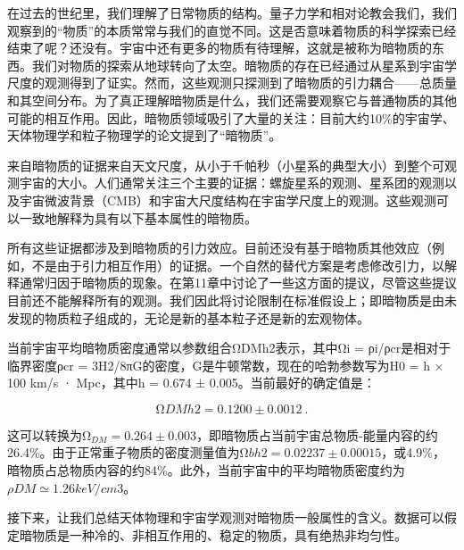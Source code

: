 
在过去的世纪里，我们理解了日常物质的结构。量子力学和相对论教会我们，我们观察到的“物质”的本质常常与我们的直觉不同。这是否意味着物质的科学探索已经结束了呢？还没有。宇宙中还有更多的物质有待理解，这就是被称为暗物质的东西。我们对物质的探索从地球转向了太空。暗物质的存在已经通过从星系到宇宙学尺度的观测得到了证实。然而，这些观测只探测到了暗物质的引力耦合——总质量和其空间分布。为了真正理解暗物质是什么，我们还需要观察它与普通物质的其他可能的相互作用。因此，暗物质领域吸引了大量的关注：目前大约10\%的宇宙学、天体物理学和粒子物理学的论文提到了“暗物质”。

来自暗物质的证据来自天文尺度，从小于千帕秒（小星系的典型大小）到整个可观测宇宙的大小。人们通常关注三个主要的证据：螺旋星系的观测、星系团的观测以及宇宙微波背景（CMB）和宇宙大尺度结构在宇宙学尺度上的观测。这些观测可以一致地解释为具有以下基本属性的暗物质。

所有这些证据都涉及到暗物质的引力效应。目前还没有基于暗物质其他效应（例如，不是由于引力相互作用）的证据。一个自然的替代方案是考虑修改引力，以解释通常归因于暗物质的现象。在第11章中讨论了一些这方面的提议，尽管这些提议目前还不能解释所有的观测。我们因此将讨论限制在标准假设上；即暗物质是由未发现的物质粒子组成的，无论是新的基本粒子还是新的宏观物体。

当前宇宙平均暗物质密度通常以参数组合ΩDMh2表示，其中Ωi = ρi/ρcr是相对于临界密度ρcr = 3H2/8πG的密度，G是牛顿常数，现在的哈勃参数写为H0 = h × 100 km/s · Mpc，其中h = 0.674 ± 0.005。当前最好的确定值是：

\begin{equation}
ΩDMh2 = 0.1200 \pm 0.0012~.
\end{equation}

这可以转换为$Ω_{DM} = 0.264 \pm 0.003$，即暗物质占当前宇宙总物质-能量内容的约26.4\%。由于正常重子物质的密度测量值为$Ωbh2 = 0.02237 ± 0.00015$，或4.9\%，暗物质占总物质内容的约84\%。此外，当前宇宙中的平均暗物质密度约为$ρDM \simeq 1.26 keV/ cm3$。

接下来，让我们总结天体物理和宇宙学观测对暗物质一般属性的含义。数据可以假定暗物质是一种冷的、非相互作用的、稳定的物质，具有绝热非均匀性。

